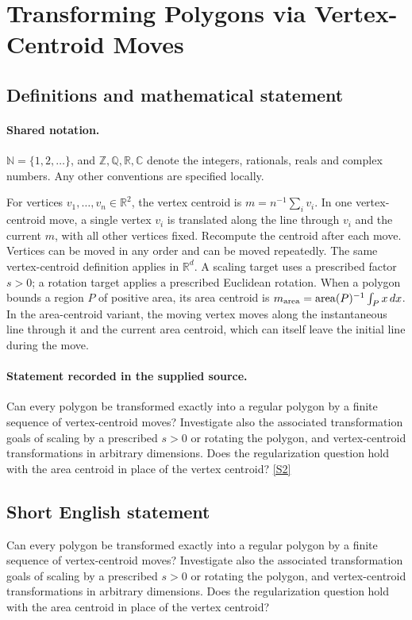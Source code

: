 \documentclass[11pt]{article}
\newcommand{\sref}[2]{\hyperlink{source:#1:#2}{[S#2]}}
\begin{document}
\section{Transforming Polygons via Vertex-Centroid Moves}\label{statement}

\subsection{Definitions and mathematical statement}

\paragraph{Shared notation.}$\mathbb N=\{1,2,\ldots\}$, and $\mathbb Z,\mathbb Q,\mathbb R,\mathbb C$ denote the integers, rationals, reals and complex numbers. Any other conventions are specified locally.


For vertices $v_1,\ldots,v_n\in\mathbb R^2$, the vertex centroid is $m=n^{-1}\sum_i v_i$. In one vertex-centroid move, a single vertex $v_i$ is translated along the line through $v_i$ and the current $m$, with all other vertices fixed. Recompute the centroid after each move. Vertices can be moved in any order and can be moved repeatedly. The same vertex-centroid definition applies in $\mathbb R^d$. A scaling target uses a prescribed factor $s>0$; a rotation target applies a prescribed Euclidean rotation. When a polygon bounds a region $P$ of positive area, its area centroid is $m_{\rm area}=\operatorname{area}(P)^{-1}\int_P x\,dx$. In the area-centroid variant, the moving vertex moves along the instantaneous line through it and the current area centroid, which can itself leave the initial line during the move.
\paragraph{Statement recorded in the supplied source.}
Can every polygon be transformed exactly into a regular polygon by a finite sequence of vertex-centroid moves? Investigate also the associated transformation goals of scaling by a prescribed $s>0$ or rotating the polygon, and vertex-centroid transformations in arbitrary dimensions. Does the regularization question hold with the area centroid in place of the vertex centroid? \sref{statement}{2}
\subsection{Short English statement}
Can every polygon be transformed exactly into a regular polygon by a finite sequence of vertex-centroid moves? Investigate also the associated transformation goals of scaling by a prescribed $s>0$ or rotating the polygon, and vertex-centroid transformations in arbitrary dimensions. Does the regularization question hold with the area centroid in place of the vertex centroid?
\end{document}
